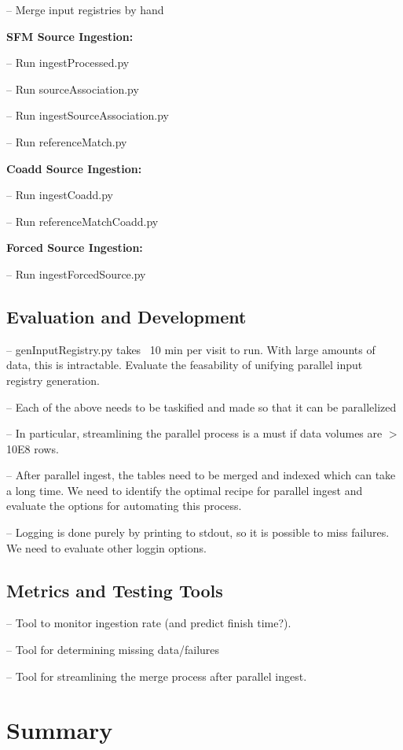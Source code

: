 \documentclass[12pt]{article}
\begin{document}
-- Merge input registries by hand

{\bf SFM Source Ingestion:}

-- Run ingestProcessed.py

-- Run sourceAssociation.py

-- Run ingestSourceAssociation.py

-- Run referenceMatch.py

{\bf Coadd Source Ingestion:}

-- Run ingestCoadd.py

-- Run referenceMatchCoadd.py

{\bf Forced Source Ingestion:}

-- Run ingestForcedSource.py

\subsection{Evaluation and Development}
-- genInputRegistry.py takes ~10 min per visit to run.  With large amounts of data, this is intractable.  Evaluate the feasability of unifying parallel input registry generation.

-- Each of the above needs to be taskified and made so that it can be parallelized

-- In particular, streamlining the parallel process is a must if data volumes are $>$ 10E8 rows.

-- After parallel ingest, the tables need to be merged and indexed which can take a long time.  We need to identify the optimal recipe for parallel ingest and evaluate the options for automating this process.

-- Logging is done purely by printing to stdout, so it is possible to miss failures.  We need to evaluate other loggin options.

\subsection{Metrics and Testing Tools}

-- Tool to monitor ingestion rate (and predict finish time?).

-- Tool for determining missing data/failures

-- Tool for streamlining the merge process after parallel ingest.


\clearpage 
\section{Summary} 
\end{document}
